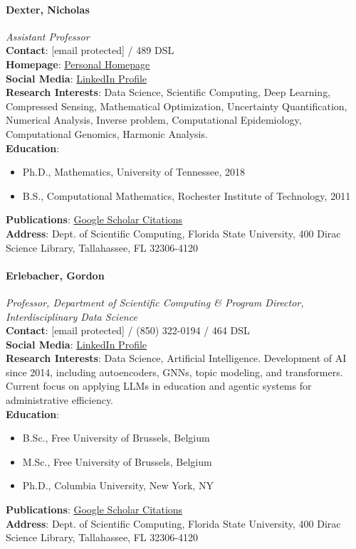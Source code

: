 \documentclass[12pt,a4paper]{article}
\begin{document}
\paragraph{Dexter, Nicholas}
\textit{Assistant Professor}\\
\textbf{Contact}: [email protected] / 489 DSL\\
\textbf{Homepage}: \href{https://nickdexter.github.io/}{Personal Homepage}\\
\textbf{Social Media}: \href{https://www.linkedin.com/in/nicholas-dexter-b9a352166/}{LinkedIn Profile}\\
\textbf{Research Interests}: Data Science, Scientific Computing, Deep Learning, Compressed Sensing, Mathematical Optimization, Uncertainty Quantification, Numerical Analysis, Inverse problem, Computational Epidemiology, Computational Genomics, Harmonic Analysis.\\
\textbf{Education}:
\begin{itemize}
    \item Ph.D., Mathematics, University of Tennessee, 2018
    \item B.S., Computational Mathematics, Rochester Institute of Technology, 2011
\end{itemize}
\textbf{Publications}: \href{https://scholar.google.com/citations?user=Y4k7e7QAAAAJ}{Google Scholar Citations}\\
\textbf{Address}: Dept. of Scientific Computing, Florida State University, 400 Dirac Science Library, Tallahassee, FL 32306-4120

\paragraph{Erlebacher, Gordon}
\textit{Professor, Department of Scientific Computing \& Program Director, Interdisciplinary Data Science}\\
\textbf{Contact}: [email protected] / (850) 322-0194 / 464 DSL\\
\textbf{Social Media}: \href{https://www.linkedin.com/in/gordon-erlebacher-389178/}{LinkedIn Profile}\\
\textbf{Research Interests}: Data Science, Artificial Intelligence. Development of AI since 2014, including autoencoders, GNNs, topic modeling, and transformers. Current focus on applying LLMs in education and agentic systems for administrative efficiency.\\
\textbf{Education}:
\begin{itemize}
    \item B.Sc., Free University of Brussels, Belgium
    \item M.Sc., Free University of Brussels, Belgium
    \item Ph.D., Columbia University, New York, NY
\end{itemize}
\textbf{Publications}: \href{https://scholar.google.com/citations?user=j52f5hIAAAAJ}{Google Scholar Citations}\\
\textbf{Address}: Dept. of Scientific Computing, Florida State University, 400 Dirac Science Library, Tallahassee, FL 32306-4120
\end{document}
